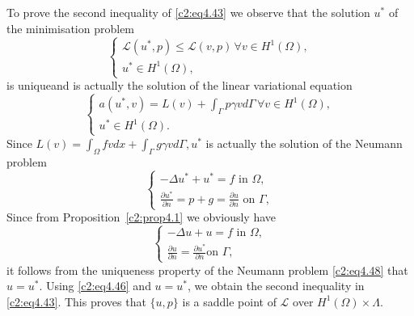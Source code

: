 To prove the second inequality of \eqref{c2:eq4.43} we observe that the solution
$u^*$ of the minimisation problem  
\begin{equation}
\begin{cases}
\mathscr{L} (u^*, p) \leq \mathscr{L} (v, p)\, \forall  v \in
H^1(\Omega),\\ 
u^* \in H^1 (\Omega), \tag{4.46}\label{c2:eq4.46}
\end{cases}
\end{equation}
is unique\pageoriginale  and is actually the solution of the linear variational
equation  
\begin{equation}
\begin{cases}
a(u^*,v) = L (v) + \int_\Gamma p \gamma v d \Gamma\, \forall  v \in
H^1 (\Omega),\\ 
 u^* \in  H^1 (\Omega). \tag{4.47}\label{c2:eq4.47}
\end{cases}
\end{equation}
Since $L(v) = \int_\Omega f v dx + \int_\Gamma g \gamma v d \Gamma,
u^*$ is actually the solution of the Neumann problem  
\begin{equation}
\begin{cases}
-\Delta u^* + u^* = f \text{ in } \Omega,\\
 \frac{\partial u^*}{\partial n} =  p + g = \frac{\partial u}{
   \partial n}\text{ on } \Gamma,\tag{4.48}\label{c2:eq4.48} 
\end{cases}
\end{equation}
Since from Proposition~\ref{c2:prop4.1} we obviously have 
\begin{equation*}
\begin{cases}
-\Delta u + u = f \text{ in }\Omega,\\
 \frac{\partial u}{\partial n}= \frac{\partial u^*}{\partial n} \text{
   on }\Gamma, 
\end{cases}
\end{equation*}
it follows from the uniqueness property of the Neumann problem \eqref{c2:eq4.48}
that $u=u^*$. Using \eqref{c2:eq4.46} and $u=u^*$, we obtain the second
inequality in \eqref{c2:eq4.43}. This proves that $\{u, p\}$ is a saddle point of
$\mathscr{L}$ over $H^1(\Omega)\times \Lambda$.  

